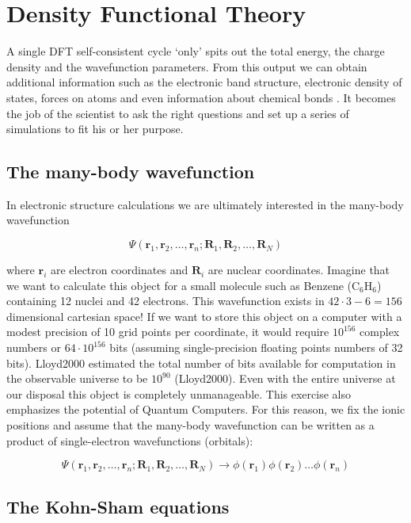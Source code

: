 \section{Density Functional Theory}\label{sec:dft}

A single DFT self-consistent cycle `only' spits out the total energy, the charge density and the wavefunction parameters. From this output we can obtain additional information such as the electronic band structure, electronic density of states, forces on atoms and even information about chemical bonds \cite{Silvi1994}. It becomes the job of the scientist to ask the right questions and set up a series of simulations to fit his or her purpose.

\subsection{The many-body wavefunction}
In electronic structure calculations we are ultimately interested in the many-body wavefunction

\[ \Psi(\bm{r}_1,\bm{r}_2,\dots, \bm{r}_n; \bm{R}_1, \bm{R}_2, \dots , \bm{R}_N) \]

\noindent where $\bm{r}_i$ are electron coordinates and $\bm{R}_i$ are nuclear coordinates. Imagine that we want to calculate this object for a small molecule such as Benzene (C$_6$H$_6$) containing 12 nuclei and 42 electrons. This wavefunction exists in $42\cdot3-6 = 156$ dimensional cartesian space! If we want to store this object on a computer with a modest precision of 10 grid points per coordinate, it would require $10^{156}$ complex numbers or $64 \cdot 10^{156}$ bits (assuming single-precision floating points numbers of 32 bits). Lloyd2000 estimated the total number of bits available for computation in the observable universe to be $10^{90}$ (Lloyd2000). Even with the entire universe at our disposal this object is completely unmanageable. This exercise also emphasizes the potential of Quantum Computers. For this reason, we fix the ionic positions and assume that the many-body wavefunction can be written as a product of single-electron wavefunctions (orbitals):

\[ \Psi(\bm{r}_1,\bm{r}_2,\dots, \bm{r}_n; \bm{R}_1, \bm{R}_2, \dots , \bm{R}_N) \longrightarrow \phi(\bm{r}_1)\phi(\bm{r}_2)\dots\phi(\bm{r}_n) \]

\subsection{The Kohn-Sham equations}

